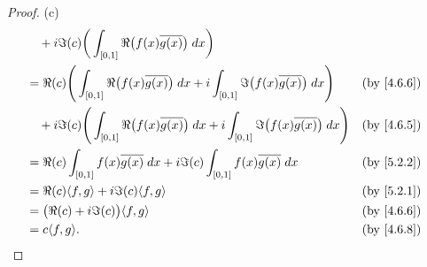 \begin{proof}{(c)}
\begin{align*}
     & \quad + i \Im(c) \bigg(\int_{[0, 1]} \Re\big(f(x) \overline{g(x)}\big) \; dx\bigg)                                                                                                               \\
     & = \Re(c) \Bigg(\int_{[0, 1]} \Re\big(f(x) \overline{g(x)}\big) \; dx + i \int_{[0, 1]} \Im\big(f(x) \overline{g(x)}\big) \; dx\Bigg)         &                                      & \by{4.6.6} \\
     & \quad + i \Im(c) \Bigg(\int_{[0, 1]} \Re\big(f(x) \overline{g(x)}\big) \; dx + i \int_{[0, 1]} \Im\big(f(x) \overline{g(x)}\big) \; dx\Bigg) &                                      & \by{4.6.5} \\
     & = \Re(c) \int_{[0, 1]} f(x) \overline{g(x)} \; dx + i \Im(c) \int_{[0, 1]} f(x) \overline{g(x)} \; dx                                        &                                      & \by{5.2.2} \\
     & = \Re(c) \inner*{f, g} + i \Im(c) \inner*{f, g}                                                                                              &                                      & \by{5.2.1} \\
     & = \big(\Re(c) + i \Im(c)\big) \inner*{f, g}                                                                                                  &                                      & \by{4.6.6} \\
     & = c \inner*{f, g}.                                                                                                                           &                                      & \by{4.6.8}
  \end{align*}
\end{proof}

